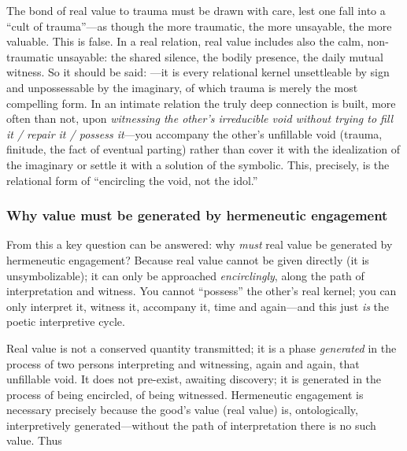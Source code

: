 The bond of real value to trauma must be drawn with care, lest one fall into a ``cult of trauma''---as though the more traumatic, the more unsayable, the more valuable. This is false. In a real relation, real value includes also the calm, non-traumatic unsayable: the shared silence, the bodily presence, the daily mutual witness. So it should be said: ---it is every relational kernel unsettleable by sign and unpossessable by the imaginary, of which trauma is merely the most compelling form. In an intimate relation the truly deep connection is built, more often than not, upon \emph{witnessing the other's irreducible void without trying to fill it / repair it / possess it}---you accompany the other's unfillable void (trauma, finitude, the fact of eventual parting) rather than cover it with the idealization of the imaginary or settle it with a solution of the symbolic. This, precisely, is the relational form of ``encircling the void, not the idol.''

\subsubsection{Why value must be generated by hermeneutic engagement}

From this a key question can be answered: why \emph{must} real value be generated by hermeneutic engagement? Because real value cannot be given directly (it is unsymbolizable); it can only be approached \emph{encirclingly}, along the path of interpretation and witness. You cannot ``possess'' the other's real kernel; you can only interpret it, witness it, accompany it, time and again---and this just \emph{is} the poetic interpretive cycle.

\begin{claim}
Real value is not a conserved quantity transmitted; it is a phase \emph{generated} in the process of two persons interpreting and witnessing, again and again, that unfillable void. It does not pre-exist, awaiting discovery; it is generated in the process of being encircled, of being witnessed. Hermeneutic engagement is necessary precisely because the good's value (real value) is, ontologically, interpretively generated---without the path of interpretation there is no such value. Thus 
\end{claim}

